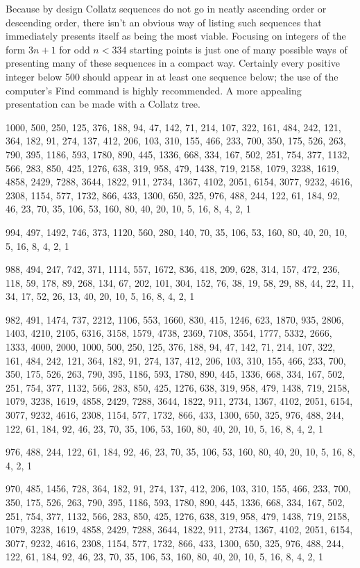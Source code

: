 \documentclass[12pt]{article}
\begin{document}
Because by design Collatz sequences do not go in neatly ascending order or descending order, there isn't an obvious way of listing such sequences that immediately presents itself as being the most viable. Focusing on integers of the form $3n + 1$ for odd $n < 334$ starting points is just one of many possible ways of presenting many of these sequences in a compact way. Certainly every positive integer below 500 should appear in at least one sequence below; the use of the computer's Find command is highly recommended. A more appealing presentation can be made with a Collatz tree.

1000, 500, 250, 125, 376, 188, 94, 47, 142, 71, 214, 107, 322, 161, 484, 242, 121, 364, 182, 91, 274, 137, 412, 206, 103, 310, 155, 466, 233, 700, 350, 175, 526, 263, 790, 395, 1186, 593, 1780, 890, 445, 1336, 668, 334, 167, 502, 251, 754, 377, 1132, 566, 283, 850, 425, 1276, 638, 319, 958, 479, 1438, 719, 2158, 1079, 3238, 1619, 4858, 2429, 7288, 3644, 1822, 911, 2734, 1367, 4102, 2051, 6154, 3077, 9232, 4616, 2308, 1154, 577, 1732, 866, 433, 1300, 650, 325, 976, 488, 244, 122, 61, 184, 92, 46, 23, 70, 35, 106, 53, 160, 80, 40, 20, 10, 5, 16, 8, 4, 2, 1

994, 497, 1492, 746, 373, 1120, 560, 280, 140, 70, 35, 106, 53, 160, 80, 40, 20, 10, 5, 16, 8, 4, 2, 1

988, 494, 247, 742, 371, 1114, 557, 1672, 836, 418, 209, 628, 314, 157, 472, 236, 118, 59, 178, 89, 268, 134, 67, 202, 101, 304, 152, 76, 38, 19, 58, 29, 88, 44, 22, 11, 34, 17, 52, 26, 13, 40, 20, 10, 5, 16, 8, 4, 2, 1

982, 491, 1474, 737, 2212, 1106, 553, 1660, 830, 415, 1246, 623, 1870, 935, 2806, 1403, 4210, 2105, 6316, 3158, 1579, 4738, 2369, 7108, 3554, 1777, 5332, 2666, 1333, 4000, 2000, 1000, 500, 250, 125, 376, 188, 94, 47, 142, 71, 214, 107, 322, 161, 484, 242, 121, 364, 182, 91, 274, 137, 412, 206, 103, 310, 155, 466, 233, 700, 350, 175, 526, 263, 790, 395, 1186, 593, 1780, 890, 445, 1336, 668, 334, 167, 502, 251, 754, 377, 1132, 566, 283, 850, 425, 1276, 638, 319, 958, 479, 1438, 719, 2158, 1079, 3238, 1619, 4858, 2429, 7288, 3644, 1822, 911, 2734, 1367, 4102, 2051, 6154, 3077, 9232, 4616, 2308, 1154, 577, 1732, 866, 433, 1300, 650, 325, 976, 488, 244, 122, 61, 184, 92, 46, 23, 70, 35, 106, 53, 160, 80, 40, 20, 10, 5, 16, 8, 4, 2, 1

976, 488, 244, 122, 61, 184, 92, 46, 23, 70, 35, 106, 53, 160, 80, 40, 20, 10, 5, 16, 8, 4, 2, 1

970, 485, 1456, 728, 364, 182, 91, 274, 137, 412, 206, 103, 310, 155, 466, 233, 700, 350, 175, 526, 263, 790, 395, 1186, 593, 1780, 890, 445, 1336, 668, 334, 167, 502, 251, 754, 377, 1132, 566, 283, 850, 425, 1276, 638, 319, 958, 479, 1438, 719, 2158, 1079, 3238, 1619, 4858, 2429, 7288, 3644, 1822, 911, 2734, 1367, 4102, 2051, 6154, 3077, 9232, 4616, 2308, 1154, 577, 1732, 866, 433, 1300, 650, 325, 976, 488, 244, 122, 61, 184, 92, 46, 23, 70, 35, 106, 53, 160, 80, 40, 20, 10, 5, 16, 8, 4, 2, 1
\end{document}
